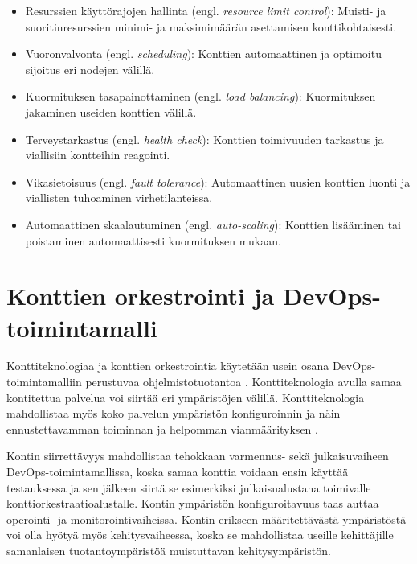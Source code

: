 \begin{itemize}
\item Resurssien käyttörajojen hallinta (engl. \textit{resource limit control}): Muisti- ja suoritinresurssien minimi- ja maksimimäärän asettamisen konttikohtaisesti.
\item Vuoronvalvonta (engl. \textit{scheduling}): Konttien automaattinen ja optimoitu sijoitus eri nodejen välillä.
\item Kuormituksen tasapainottaminen (engl. \textit{load balancing}): Kuormituksen jakaminen useiden konttien välillä. 
\item Terveystarkastus (engl. \textit{health check}): Konttien toimivuuden tarkastus ja viallisiin kontteihin reagointi.
\item Vikasietoisuus (engl. \textit{fault tolerance}): Automaattinen uusien konttien luonti ja viallisten tuhoaminen virhetilanteissa.
\item Automaattinen skaalautuminen (engl. \textit{auto-scaling}): Konttien lisääminen tai poistaminen automaattisesti kuormituksen mukaan.
\end{itemize}



\section{Konttien orkestrointi ja DevOps-toimintamalli}

Konttiteknologiaa ja konttien orkestrointia käytetään usein osana DevOps-toimintamalliin perustuvaa ohjelmistotuotantoa \cite{Kang16, Narasimhulu23}.
Konttiteknologia avulla samaa kontitettua palvelua voi siirtää eri ympäristöjen välillä.
Konttiteknologia mahdollistaa myös koko palvelun ympäristön konfiguroinnin ja näin ennustettavamman toiminnan ja helpomman vianmäärityksen \cite{Narasimhulu23}.

Kontin siirrettävyys mahdollistaa tehokkaan varmennus- sekä julkaisuvaiheen DevOps-toimintamallissa, koska samaa konttia voidaan ensin käyttää testauksessa ja sen jälkeen siirtä se esimerkiksi julkaisualustana toimivalle konttiorkestraatioalustalle.
Kontin ympäristön konfiguroitavuus taas auttaa operointi- ja monitorointivaiheissa.
Kontin erikseen määritettävästä ympäristöstä voi olla hyötyä myös kehitysvaiheessa, koska se mahdollistaa useille kehittäjille samanlaisen tuotantoympäristöä muistuttavan kehitysympäristön.

